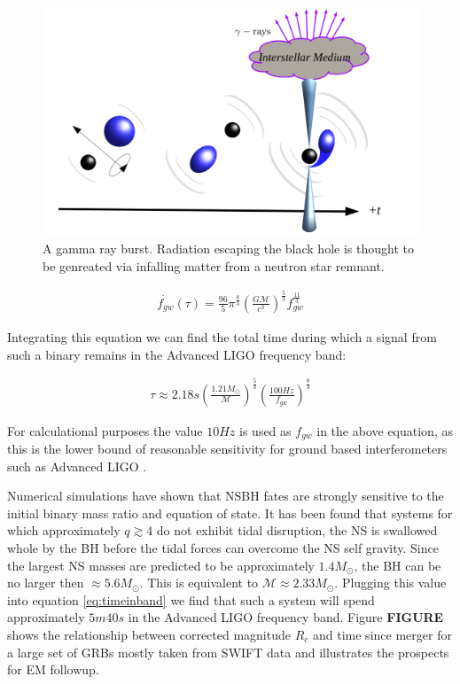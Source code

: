 \begin{figure}[!htb]\label{fig:gamray}
\hspace{-0.5cm}
\caption{A gamma ray burst. Radiation escaping the black hole is thought to be genreated via infalling matter from a neutron star remnant.} 
\includegraphics[scale=0.35]{gamray.png}
\end{figure}

\begin{align}
\dot{f_{gw}}(\tau) = \frac{96}{5}\pi^{\frac{8}{3}} \left(\frac{G \mathcal{M}}{c^3}\right)^{\frac{5}{3}}f_{gw}^{\frac{11}{3}}
\end{align}

Integrating this equation we can find the total time during which a signal from such a binary remains in the Advanced LIGO frequency band:

\begin{align}\label{eq:timeinband}
\tau \approx 2.18s\left(\frac{1.21M_\odot}{\mathcal{M}}\right)^{\frac{5}{3}}\left(\frac{100Hz}{f_{gw}}\right)^{\frac{8}{3}}
\end{align}

For calculational purposes the value $10Hz$ is used as $f_{gw}$ in the above equation, as this is the lower bound of reasonable sensitivity for ground based interferometers such as Advanced LIGO \cite{advligo}.

Numerical simulations have shown that NSBH fates are strongly sensitive to the initial binary mass ratio and equation of state. It has been found that systems for which approximately $q \gtrsim 4$ do not exhibit tidal disruption, the NS is swallowed whole by the BH before the tidal forces can overcome the NS self gravity. Since the largest NS masses are predicted \cite{nsmasslim} to be approximately $1.4M_\odot$, the BH can be no larger then $\approx 5.6M_\odot$. This is equivalent to $\mathcal{M} \approx 2.33M_\odot$. Plugging this value into equation \ref{eq:timeinband} we find that such a system will spend approximately $5m 40s$ in the Advanced LIGO frequency band. Figure \textbf{FIGURE} shows the relationship between corrected magnitude $R_c$ and time since merger for a large set of GRBs mostly taken from SWIFT \cite{grbcatalog} data and illustrates the prospects for EM followup.  

